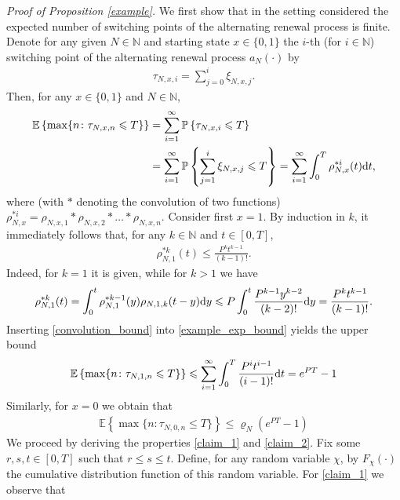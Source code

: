\documentclass[11pt,reqno]{amsart}
\numberwithin{equation}{section}
\newcommand{\E}[1]{\mathbb{E}\left\{ #1\right\}}
\newcommand{\pk}[1]{\mathbb{P} \left\{ #1 \right \} }
\newcommand{\N}{\mathbb{N}}
\newcommand{\neprop}[1]{{Proposition \ref{#1}}}
\newcommand{\CLN}[1]{{\color{RedOrange}#1}}
\def\td{\text{\rm d}}
\begin{document}
\textit{Proof of \neprop{example}.} 
We first show that in the setting considered the expected number of switching points of the alternating renewal process is finite. Denote for any given $N\in\N$ and starting state $x\in\{0,1\}$ the $i$-th (for $i\in\N$) switching point of the alternating renewal process \CLN{$a_N(\cdot)$} by
\begin{align*}
    \tau_{N,x,i} = \sum_{j=0}^{i}\xi_{N,x,j}. 
\end{align*}
Then, for any $x\in\{0,1\}$ and $N\in\N$,
\begin{align}
    \E{\max\{n\colon \tau_{N,x,n}\leqslant T\}} & = \sum_{i=1}^{\infty}\pk{\tau_{N,x,i}\leqslant T}\notag\\ & = \sum_{i=1}^{\infty}\pk{\sum_{j=1}^{i}\xi_{N,x,j} \leqslant T} = \sum_{i=1}^{\infty}\int_{0}^{T}\rho_{N, x} ^{\ast i}(t)\td t,\label{example_exp_bound}
\end{align}
where (with $\ast$ denoting the convolution of two functions)
$\rho_{N, x}^{\ast i} = \rho_{N, x,1}\ast\rho_{N, x,2}\ast\ldots\ast\rho_{N, x,n}.$
 Consider first $x=1$. By induction in $k$, it immediately follows that, for any $k\in\N$ and $t\in[0,T]$,
\begin{align}
    \rho_{N, 1}^{\ast k}(t)\leqslant \frac{P^{k}t^{k-1}}{(k-1)!}.\label{convolution_bound}
\end{align}
{Indeed, for $k=1$ it is given, while for $k>1$ we have}
\begin{align*}
    \rho_{N, 1}^{\ast k}(t)=\int_{0}^{t}\rho_{N,1}^{\ast k-1}(y)\rho_{N,1,k}(t-y)\td y\leqslant P\int_{0}^{t} \frac{P^{k-1}y^{k-2}}{(k-2)!}\td y= \frac{P^{k}t^{k-1}}{(k-1)!}.
\end{align*}
Inserting \eqref{convolution_bound} into \eqref{example_exp_bound} yields the upper bound
\begin{align}
    \E{\max\{n\colon \tau_{N,1,n}\leqslant T\}} \leqslant \sum_{i=1}^{\infty}\int_{0}^{T}\frac{P^{i}t^{i-1}}{(i-1)!}\td t = e^{PT}-1\label{example_exp_bound2}
\end{align}
Similarly, for $x=0$ we obtain that
\begin{align}
    \E{\max\{n\colon \tau_{N,0,n}\leqslant T\}} \leqslant \varrho_N(e^{PT}-1) \label{example_exp_bound3}
\end{align}
We proceed by deriving the properties \eqref{claim_1} and \eqref{claim_2}. Fix some $r,s,t\in[0,T]$ such that $r\leqslant s\leqslant t$. {Define, for any random variable $\chi$, by $F_{\chi}(\cdot)$ the cumulative distribution function of this random variable.} For \eqref{claim_1} we observe that
\end{document}
